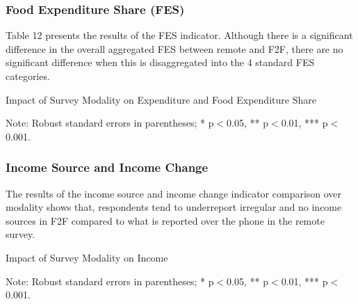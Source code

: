 \documentclass[11pt,harvard]{article}
\begin{document}
\subsubsection{Food Expenditure Share (FES)}
	
Table 12 presents the results of the FES indicator. Although there is a significant difference in the overall aggregated FES between remote and F2F, there are no significant difference when this is disaggregated into the 4 standard FES categories.
	
	\begin{table}[htbp]
		\centering
		\begin{adjustbox}{max width=\textwidth}
			\begin{threeparttable}
				\caption{Impact of Survey Modality on Expenditure and Food Expenditure Share}
				\scriptsize
				 
				\label{tab:FES_Modality_CAR}
				\begin{tablenotes}
					\item Note: Robust standard errors in parentheses; * p$<$0.05, ** p$<$0.01, *** p$<$0.001.
				\end{tablenotes}
			\end{threeparttable}
		\end{adjustbox}
	\end{table}
	
	
\subsubsection{Income Source and Income Change}

The results of the income source and income change indicator comparison over modality shows that, respondents tend to underreport irregular and no income sources in F2F compared to what is reported over the phone in the remote survey.

	\begin{table}[htbp]
		\centering
		\begin{adjustbox}{max width=\textwidth}
			\begin{threeparttable}
				\caption{Impact of Survey Modality on Income}
				\scriptsize
				 
				\label{tab:INC_Modality_CAR}
				\begin{tablenotes}
					\item Note: Robust standard errors in parentheses; * p$<$0.05, ** p$<$0.01, *** p$<$0.001.
				\end{tablenotes}
			\end{threeparttable}
		\end{adjustbox}
	\end{table}
\end{document}
